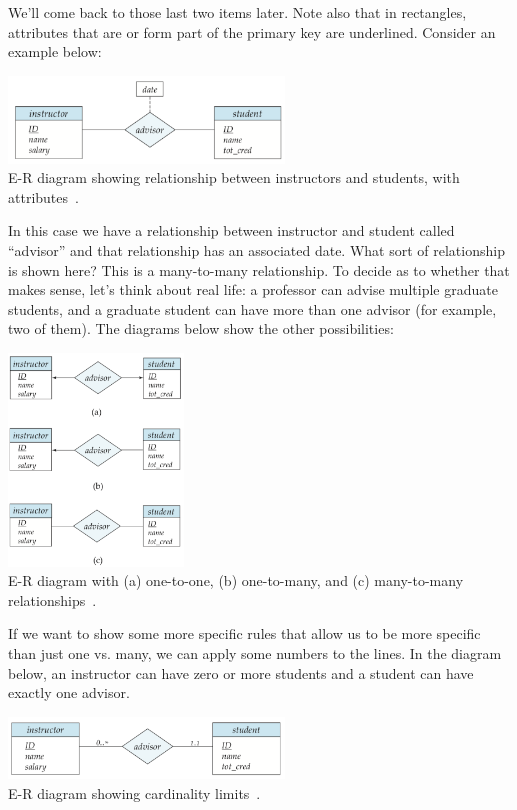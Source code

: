 We'll come back to those last two items later. Note also that in rectangles, attributes that are or form part of the primary key are underlined. Consider an example below:

\begin{center}
\includegraphics[width=0.55\textwidth]{images/er-with-attr}\\
E-R diagram showing relationship between instructors and students, with attributes~\cite{dsc}.
\end{center}

In this case we have a relationship between instructor and student called ``advisor'' and that relationship has an associated date. What sort of relationship is shown here? This is a many-to-many relationship. To decide as to whether that makes sense, let's think about real life: a professor can advise multiple graduate students, and a graduate student can have more than one advisor (for example, two of them). The diagrams below show the other possibilities:

\begin{center}
\includegraphics[width=0.35\textwidth]{images/advisor-relationship}\\
E-R diagram with (a) one-to-one, (b) one-to-many, and (c) many-to-many relationships~\cite{dsc}.
\end{center}

If we want to show some more specific rules that allow us to be more specific than just one vs. many, we can apply some numbers to the lines. In the diagram below, an instructor can have zero or more students and a student can have exactly one advisor.

\begin{center}
\includegraphics[width=0.55\textwidth]{images/cardinality-limits}\\
E-R diagram showing cardinality limits~\cite{dsc}.
\end{center}

